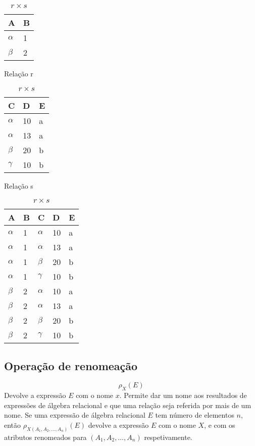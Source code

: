 \documentclass{article}
\begin{document}
\begin{table}[ht]
  \parbox{.30\linewidth}{
    \centering
    \begin{tabular}{|l|l|}
      \hline
      A        & B \\ \hline
      $\alpha$ & 1 \\ \hline
      $\beta$  & 2 \\ \hline
    \end{tabular}
    \caption{Relação r}
  }
  \hfill
  \parbox{.30\linewidth}{
    \centering
    \begin{tabular}{|l|l|l|}
      \hline
      C        & D  & E \\ \hline
      $\alpha$ & 10 & a \\ \hline
      $\alpha$ & 13 & a \\ \hline
      $\beta$  & 20 & b \\ \hline
      $\gamma$ & 10 & b \\ \hline
    \end{tabular}
    \caption{Relação s}
  }
  \hfill
  \parbox{.30\linewidth}{
    \centering
    \begin{tabular}{|l|l|l|l|l|}
      \hline
      A        & B & C        & D  & E \\ \hline
      $\alpha$ & 1 & $\alpha$ & 10 & a \\ \hline
      $\alpha$ & 1 & $\alpha$ & 13 & a \\ \hline
      $\alpha$ & 1 & $\beta$  & 20 & b \\ \hline
      $\alpha$ & 1 & $\gamma$ & 10 & b \\ \hline
      $\beta$  & 2 & $\alpha$ & 10 & a \\ \hline
      $\beta$  & 2 & $\alpha$ & 13 & a \\ \hline
      $\beta$  & 2 & $\beta$  & 20 & b \\ \hline
      $\beta$  & 2 & $\gamma$ & 10 & b \\ \hline
    \end{tabular}
    \caption{$r \times s$}
  }
\end{table}

\subsection{Operação de renomeação}
\[
  \rho_X(E)
\]
Devolve a expressão $E$ com o nome $x$. Permite dar um nome aos resultados de expressões de álgebra relacional e que uma relação seja referida por mais de um nome. Se uma expressão de álgebra relacional $E$ tem número de elementos $n$, então $\rho_{X(A_1,A_2, \dots, A_n)}(E)$ devolve a expressão $E$ com o nome $X$, e com os atributos renomeados para $(A_1,A_2, \dots, A_n)$ respetivamente.
\end{document}
